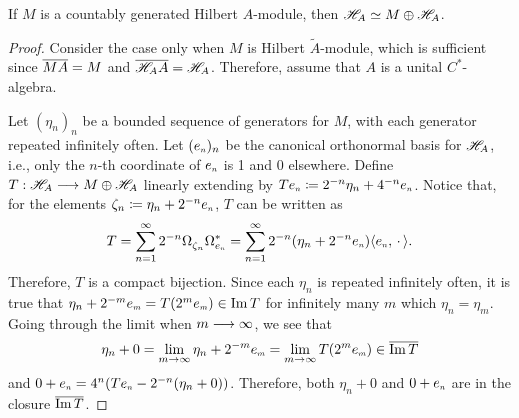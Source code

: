 \begin{teorema}
\label{teo: kasparov stabilization}
If $M$ is a countably generated Hilbert $A$-module, then $\mathscr H_A \simeq M\oplus \mathscr H_A$.
\begin{proof}
Consider the case only when $M$ is Hilbert $\widetilde{A}$-module, which is sufficient since $\overline{MA} = M$ and $\overline{\mathscr H_A A} = \mathscr H_A$. Therefore, assume that $A$ is a unital $C^*$-algebra.

Let $(\eta_n)_n$ be a bounded sequence of generators for $M$, with each generator repeated infinitely often. Let $(\sub e n)_n$ be the canonical orthonormal basis for $\mathscr H_A$, i.e., only the $n$-th coordinate of $\sub e n$ is 1 and 0 elsewhere. Define $T:\mathscr H_A\longrightarrow M\oplus \mathscr H_A$ linearly extending by $T\sub e n \coloneqq 2^{-n} \eta_n + 4^{-n}\sub e n$. Notice that, for the elements $\zeta_n \coloneqq \eta_n+2^{-n}\sub e n$, $T$ can be written as
\begin{equation*}
T = \sum_{n=1}^\infty 2^{-n} \Omega^{\vphantom{*}}_{\zeta_n}\Omega^*_{\sub e n} =  \sum_{n=1}^\infty 2^{-n} (\eta_n+2^{-n}\sub e n)\inner{\sub e n}{\come}.
\end{equation*}
Therefore, $T$ is a compact bijection. Since each $\eta_n$ is repeated infinitely often, it is true that $\eta_n + 2^{-m}\sub e m = T(2^m\sub e m)\in \Im T$ for infinitely many $m$ which $\eta_n=\eta_m$. Going through the limit when $m\longrightarrow \infty$, we see that 
\begin{equation*}
    \eta_n + 0 = \lim_{m\to \infty} \eta_n + 2^{-m}\sub e m = \lim_{m\to \infty} T(2^m\sub e m) \in \con{\Im T}
\end{equation*}
and $0 + \sub e n = 4^n (T\sub e n - 2^{-n}(\eta_n + 0))$. Therefore, both $\eta_n + 0$ and $0+\sub e n$ are in the closure $\overline{\operatorname{Im} T}$.


\end{proof}
\end{teorema}
